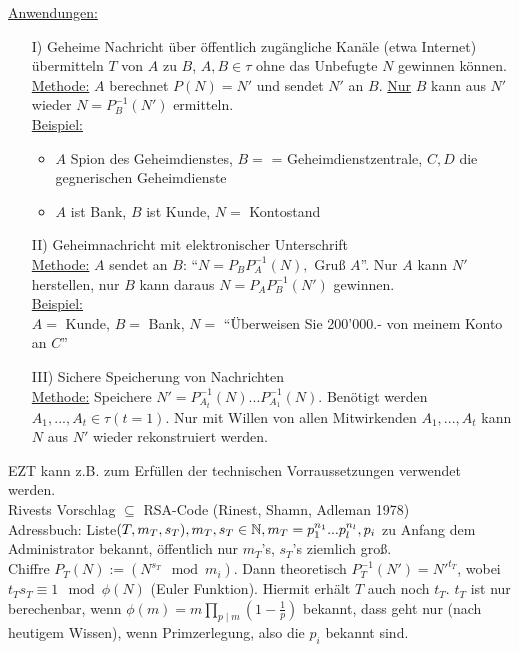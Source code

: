 \documentclass[a4paper,twoside,DIV15,BCOR12mm]{scrbook}
\begin{document}
\underline{Anwendungen:}\\
\begin{itemize}
    \item[I)] Geheime Nachricht über öffentlich  zugängliche Kanäle (etwa Internet) übermitteln $T$ von $A$ zu $B$, $A,B \in \tau$ ohne das Unbefugte $N$ gewinnen können.\\
        \underline{Methode:} $A$ berechnet $P(N) = N'$ und sendet $N'$ an $B$. \underline{Nur} $B$ kann aus $N'$ wieder $N = P_B^{-1}(N')$ ermitteln.\\
        \underline{Beispiel:}\\
            \begin{itemize}
                \item $A$ Spion des Geheimdienstes, $B =$ = Geheimdienstzentrale, $C,D$ die gegnerischen Geheimdienste
                \item $A$ ist Bank, $B$ ist Kunde, $N =$ Kontostand
            \end{itemize}
    \item[II)] Geheimnachricht mit elektronischer Unterschrift\\
        \underline{Methode:} $A$ sendet an $B$: "`$N = P_BP_A^{-1}(N), \text { Gruß }A$"'. Nur $A$ kann $N'$ herstellen, nur $B$ kann daraus $N = P_AP_B^{-1}(N')$ gewinnen.\\
        \underline{Beispiel:}\\
            $A =$ Kunde, $B =$ Bank, $N =$ "`Überweisen Sie 200'000.- von meinem Konto an $C$"'
    \item[III)] Sichere Speicherung von Nachrichten\\
        \underline{Methode:} Speichere $N' = P_{A_t}^{-1}(N)...P_{A_1}^{-1}(N)$. Benötigt werden $A_1,..., A_t \in \tau (t = 1)$. Nur mit Willen von allen Mitwirkenden $A_1,..., A_t$ kann $N$ aus $N'$ wieder rekonstruiert werden.
\end{itemize}

EZT kann z.B. zum Erfüllen der technischen Vorraussetzungen verwendet werden.\\
Rivests Vorschlag $\subseteq$ RSA-Code (Rinest, Shamn, Adleman 1978)\\
Adressbuch: Liste$(T, m_T, s_T), m_T, s_T \in \mathbb{N}, m_T = p_1^{n_1}...p_l^{n_l}, p_i$ zu Anfang dem Administrator bekannt, öffentlich nur $m_T$'s, $s_T$'s ziemlich groß.\\
Chiffre $P_T(N) := (N^{s_T} \mod m_i)$. Dann theoretisch
$P_T^{-1}(N') = N'^{t_T}$, wobei $t_Ts_T \equiv 1 \mod \phi(N)$
(Euler Funktion). Hiermit erhält $T$ auch noch $t_T$. $t_T$ ist nur
berechenbar, wenn $\phi(m) = m\prod_{p \mid m}(1-\frac{1}{p})$
bekannt, dass geht nur (nach heutigem Wissen), wenn Primzerlegung,
also die $p_i$ bekannt sind.
\end{document}
